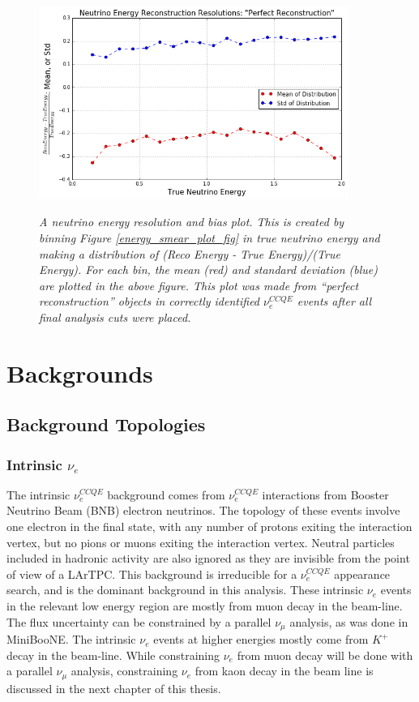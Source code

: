 \begin{figure}[ht!]
\centering
\includegraphics[width=0.9\textwidth]{Figures/LEE_EnergyRes_WithAnalysisCuts.png}\\%
\caption{\textit{A neutrino energy resolution and bias plot. This is created by binning Figure \ref{energy_smear_plot_fig} in true neutrino energy and making a distribution of (Reco Energy - True Energy)/(True Energy). For each bin, the mean (red) and standard deviation (blue) are plotted in the above figure. This plot was made from ``perfect reconstruction'' objects in correctly identified $\nu_e^{CCQE}$ events after all final analysis cuts were placed.}}
\label{energy_res_plot_fig}
\end{figure}

\section{Backgrounds}

\subsection{Background Topologies}\label{LEEbackgroundtopologiessection}

\subsubsection{Intrinsic $\nu_e$}
The intrinsic $\nu_e^{CCQE}$ background comes from $\nu_e^{CCQE}$ interactions from Booster Neutrino Beam (BNB) electron neutrinos. The topology of these events involve one electron in the final state, with any number of protons exiting the interaction vertex, but no pions or muons exiting the interaction vertex. Neutral particles included in hadronic activity are also ignored as they are invisible from the point of view of a LArTPC. This background is irreducible for a $\nu_e^{CCQE}$ appearance search, and is the dominant background in this analysis. These intrinsic $\nu_e$ events in the relevant low energy region are mostly from muon decay in the beam-line. The flux uncertainty can be constrained by a parallel $\nu_\mu$ analysis, as was done in MiniBooNE. The intrinsic $\nu_e$ events at higher energies mostly come from $K^+$ decay in the beam-line. While constraining $\nu_e$ from muon decay will be done with a parallel $\nu_\mu$ analysis, constraining $\nu_e$ from kaon decay in the beam line is discussed in the next chapter of this thesis.


